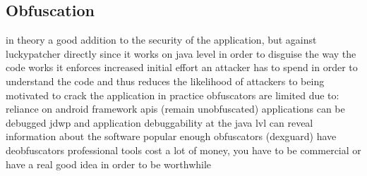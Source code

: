 \subsection{Obfuscation}
\label{subsection:evaluation-reengineering-optobf}

in theory a good addition to the security of the application, but against luckypatcher directly since it works on java level in order to disguise the way the code works
it enforces increased initial effort an attacker has to spend in order to understand the code and thus reduces the likelihood of attackers to being motivated to crack the application
in practice obfuscators are limited due to:
reliance on android framework apis (remain unobfuscated)
applications can be debugged
jdwp and application debuggability at the java lvl can reveal information about the software
popular enough obfuscators (dexguard) have deobfuscators
professional tools cost a lot of money, you have to be commercial or have a real good idea in order to be worthwhile
